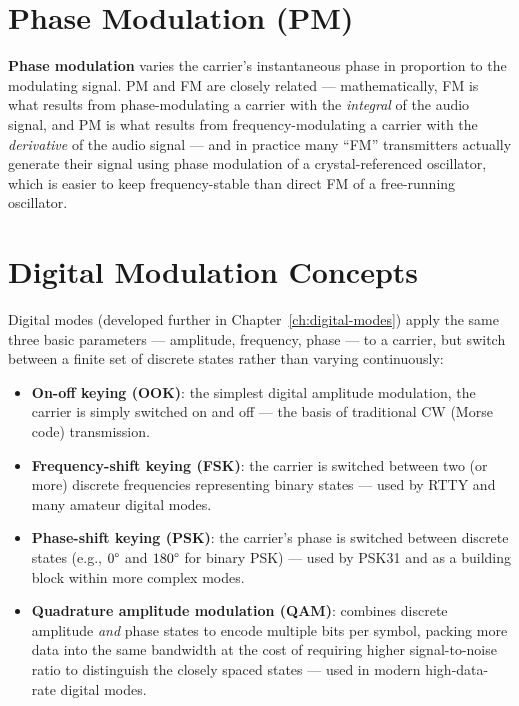 \section{Phase Modulation (PM)}

\textbf{Phase modulation} varies the carrier's instantaneous phase in
proportion to the modulating signal. PM and FM are closely related ---
mathematically, FM is what results from phase-modulating a carrier with
the \emph{integral} of the audio signal, and PM is what results from
frequency-modulating a carrier with the \emph{derivative} of the audio
signal --- and in practice many ``FM'' transmitters actually generate
their signal using phase modulation of a crystal-referenced oscillator,
which is easier to keep frequency-stable than direct FM of a
free-running oscillator.

\section{Digital Modulation Concepts}

Digital modes (developed further in Chapter~\ref{ch:digital-modes})
apply the same three basic parameters --- amplitude, frequency, phase ---
to a carrier, but switch between a finite set of discrete states rather
than varying continuously:

\begin{itemize}
\item \textbf{On-off keying (OOK)}: the simplest digital amplitude
modulation, the carrier is simply switched on and off --- the basis of
traditional CW (Morse code) transmission.
\item \textbf{Frequency-shift keying (FSK)}: the carrier is switched
between two (or more) discrete frequencies representing binary states
--- used by RTTY and many amateur digital modes.
\item \textbf{Phase-shift keying (PSK)}: the carrier's phase is switched
between discrete states (e.g., $0\degree$ and $180\degree$ for binary
PSK) --- used by PSK31 and as a building block within more complex
modes.
\item \textbf{Quadrature amplitude modulation (QAM)}: combines discrete
amplitude \emph{and} phase states to encode multiple bits per symbol,
packing more data into the same bandwidth at the cost of requiring
higher signal-to-noise ratio to distinguish the closely spaced states
--- used in modern high-data-rate digital modes.
\end{itemize}

